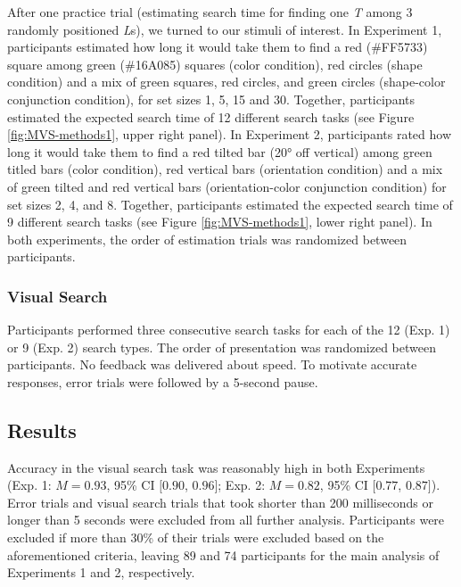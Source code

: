 \documentclass[12pt,twoside]{reedthesis}
\begin{document}
After one practice trial (estimating search time for finding one \emph{T} among 3 randomly positioned \emph{L}s), we turned to our stimuli of interest. In Experiment 1, participants estimated how long it would take them to find a red (\#FF5733) square among green (\#16A085) squares (color condition), red circles (shape condition) and a mix of green squares, red circles, and green circles (shape-color conjunction condition), for set sizes 1, 5, 15 and 30. Together, participants estimated the expected search time of 12 different search tasks (see Figure \ref{fig:MVS-methods1}, upper right panel). In Experiment 2, participants rated how long it would take them to find a red tilted bar (20° off vertical) among green titled bars (color condition), red vertical bars (orientation condition) and a mix of green tilted and red vertical bars (orientation-color conjunction condition) for set sizes 2, 4, and 8. Together, participants estimated the expected search time of 9 different search tasks (see Figure \ref{fig:MVS-methods1}, lower right panel). In both experiments, the order of estimation trials was randomized between participants.

\hypertarget{visual-search}{%
\subsubsection*{Visual Search}\label{visual-search}}

Participants performed three consecutive search tasks for each of the 12 (Exp. 1) or 9 (Exp. 2) search types. The order of presentation was randomized between participants. No feedback was delivered about speed. To motivate accurate responses, error trials were followed by a 5-second pause.

\hypertarget{results-2}{%
\subsection{Results}\label{results-2}}

Accuracy in the visual search task was reasonably high in both Experiments (Exp. 1: \(M = 0.93\), 95\% CI \([0.90\), \(0.96]\); Exp. 2: \(M = 0.82\), 95\% CI \([0.77\), \(0.87]\)). Error trials and visual search trials that took shorter than 200 milliseconds or longer than 5 seconds were excluded from all further analysis. Participants were excluded if more than 30\% of their trials were excluded based on the aforementioned criteria, leaving 89 and 74 participants for the main analysis of Experiments 1 and 2, respectively.
\end{document}

